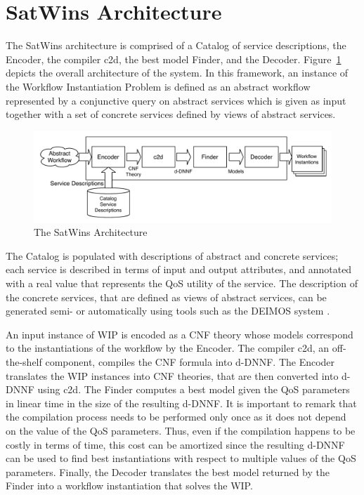 \documentclass{llncs}
\begin{document}
\section{SatWins Architecture}
 The SatWins architecture  is comprised of a Catalog of service descriptions,
the Encoder, the compiler c2d, the best model Finder, and the Decoder.
Figure~\ref{fig:architecture} depicts the overall architecture of the system.
In this framework, an instance of the Workflow Instantiation Problem is defined as an
abstract workflow represented by a conjunctive query on abstract services which
is given as input together with a set of concrete services defined by views
of abstract services. 

\begin{figure}[t]
\centering
\includegraphics[width=.9\textwidth]{architecture}
\caption{The SatWins Architecture}
\label{fig:architecture}
\end{figure}

The Catalog is populated with descriptions of abstract and concrete services;
each service is described in terms of input and output attributes, and annotated
with a real value that represents the QoS utility of the service.
The description of the concrete services, that are defined as views of abstract
services, can be generated semi- or automatically using tools such as the DEIMOS
system \cite{AmbiteISWC09}. 

An input instance of WIP is encoded as a CNF theory whose models correspond to
the instantiations of the workflow by the Encoder. 
The compiler c2d, an off-the-shelf
component, compiles the CNF formula into d-DNNF.
The Encoder translates the WIP instances into CNF theories, that are then converted
into d-DNNF using c2d. The Finder computes a best model given the QoS parameters
in linear time in the size of the resulting d-DNNF. It is important to remark
that the compilation process needs to be performed only once as it does not
depend on the value of the QoS parameters. Thus, even if the compilation happens
to be costly in terms of time, this cost can be amortized since the resulting
d-DNNF can be used to find best instantiations with respect to multiple values
of the QoS parameters.
Finally, the Decoder translates the best model returned by the Finder into
a workflow instantiation that solves the WIP.
\end{document}
